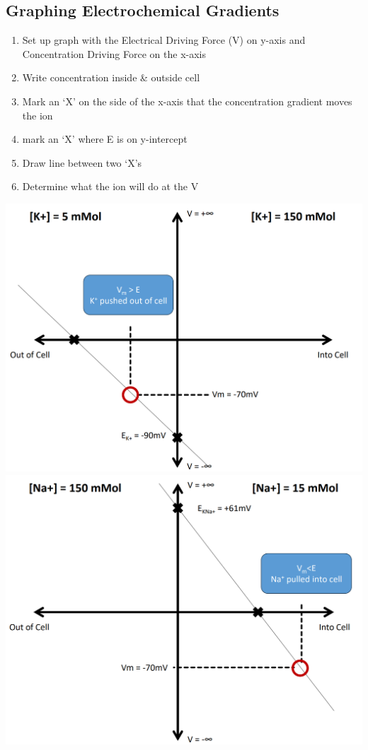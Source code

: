 \documentclass[11pt,fleqn]{book}
\begin{document}
\subsection{Graphing Electrochemical Gradients}
\begin{enumerate}
    \item Set up graph with the Electrical Driving Force (V) on y-axis and Concentration Driving Force on the x-axis
    \item Write concentration inside \& outside cell
    \item Mark an ‘X’ on the side of the x-axis that the concentration gradient moves the ion
    \item mark an ‘X’ where E is on y-intercept
    \item Draw line between two ‘X’s
    \item Determine what the ion will do at the V
\end{enumerate}
\begin{center}
    \includegraphics[width=0.65\linewidth]{Pictures/Screenshot 2024-02-25 220308.png}
    \includegraphics[width=0.65\linewidth]{Pictures/Screenshot 2024-02-25 222320.png}
\end{center}
\end{document}
